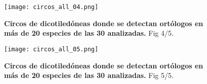 \begin{landscape}
    \begin{figure}[htbp!] 
        \centering    
        \texttt{[image: circos\_all\_04.png]}
        \caption[Circos de dicotiledóneas (en más de 20 especies). 4/5]{
        \textbf{Circos de dicotiledóneas donde se detectan ortólogos en más de 20 especies de las 30 analizadas.}
        Fig 4/5.
        }
        \label{fig:circos_all_04}
    \end{figure}
\end{landscape}

\begin{landscape}
    \begin{figure}[htbp!] 
        \centering    
        \texttt{[image: circos\_all\_05.png]}
        \caption[Circos de dicotiledóneas (en más de 20 especies). 5/5]{
        \textbf{Circos de dicotiledóneas donde se detectan ortólogos en más de 20 especies de las 30 analizadas.}
        Fig 5/5.
        }
        \label{fig:circos_all_05}
    \end{figure}
\end{landscape}


